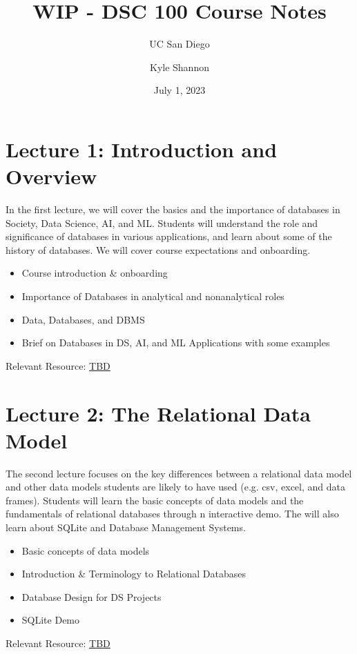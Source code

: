 \documentclass[11pt, letterpaper]{article}
\title{WIP - DSC 100 Course Notes}
\subtitle{UC San Diego}
\author{Kyle Shannon}
\date{July 1, 2023}
\let\oldsection\section
\renewcommand\section{\clearpage\oldsection}
\begin{document}
	\thispagestyle{empty}
	\maketitle
	\tableofcontents
	
	\newpage
	
	\section*{Lecture 1: Introduction and Overview}
	In the first lecture, we will cover the basics and the importance of databases in Society, Data Science, AI, and ML. Students will understand the role and significance of databases in various applications, and learn about some of the history of databases. We will cover course expectations and onboarding.
	\begin{itemize}
		\item Course introduction \& onboarding
		\item Importance of Databases in analytical and nonanalytical roles
		\item Data, Databases, and DBMS
		\item Brief on Databases in DS, AI, and ML Applications with some examples
	\end{itemize}
	Relevant Resource: \href{https://example.com}{TBD}
	
	\section*{Lecture 2: The Relational Data Model}
	The second lecture focuses on the key differences between a relational data model and other data models students are likely to have used (e.g. csv, excel, and data frames). Students will learn the basic concepts of data models and the fundamentals of relational databases through n interactive demo. The will also learn about SQLite and Database Management Systems.
	\begin{itemize}
		\item Basic concepts of data models
		\item Introduction \& Terminology to Relational Databases
		\item  Database Design for DS Projects 
		\item SQLite Demo
	\end{itemize}
	Relevant Resource: \href{https://example.com}{TBD}
	
\end{document}
